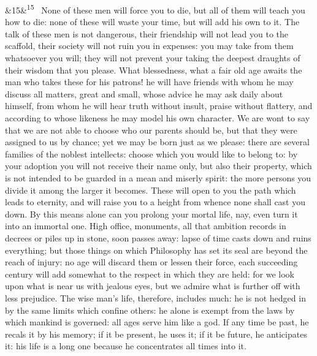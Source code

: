\documentclass[12pt]{article}
\newcommand{\para}[1][]{\par\noindent\ifx&#1&\else\textsuperscript{\footnotesize #1}~\fi}
\begin{document}
\para[15] None of these men will force you to die, but all of them will teach you how to die: none of these will waste your time, but will add his own to it. The talk of these men is not dangerous, their friendship will not lead you to the scaffold, their society will not ruin you in expenses: you may take from them whatsoever you will; they will not prevent your taking the deepest draughts of their wisdom that you please. What blessedness, what a fair old age awaits the man who takes these for his patrons! he will have friends with whom he may discuss all matters, great and small, whose advice he may ask daily about himself, from whom he will hear truth without insult, praise without flattery, and according to whose likeness he may model his own character. We are wont to say that we are not able to choose who our parents should be, but that they were assigned to us by chance; yet we may be born just as we please: there are several families of the noblest intellects: choose which you would like to belong to: by your adoption you will not receive their name only, but also their property, which is not intended to be guarded in a mean and miserly spirit: the more persons you divide it among the larger it becomes. These will open to you the path which leads to eternity, and will raise you to a height from whence none shall cast you down. By this means alone can you prolong your mortal life, nay, even turn it into an immortal one. High office, monuments, all that ambition records in decrees or piles up in stone, soon passes away: lapse of time casts down and ruins everything; but those things on which Philosophy has set its seal are beyond the reach of injury: no age will discard them or lessen their force, each succeeding century will add somewhat to the respect in which they are held: for we look upon what is near us with jealous eyes, but we admire what is further off with less prejudice. The wise man’s life, therefore, includes much: he is not hedged in by the same limits which confine others: he alone is exempt from the laws by which mankind is governed: all ages serve him like a god. If any time be past, he recals it by his memory; if it be present, he uses it; if it be future, he anticipates it: his life is a long one because he concentrates all times into it.
\end{document}
